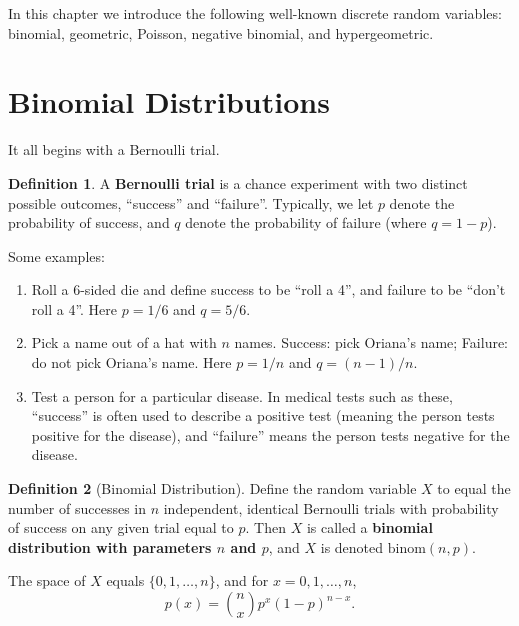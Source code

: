 \documentclass[
]{book}
\providecommand{\tightlist}{%
  \setlength{\itemsep}{0pt}\setlength{\parskip}{0pt}}
\theoremstyle{definition}
\newtheorem{definition}{Definition}[chapter]
\theoremstyle{definition}
\theoremstyle{definition}
\theoremstyle{definition}
\theoremstyle{remark}
\begin{document}
In this chapter we introduce the following well-known discrete random variables:
binomial, geometric, Poisson, negative binomial, and hypergeometric.

\section{Binomial Distributions}\label{binomial}

It all begins with a Bernoulli trial.

\begin{definition}
\protect\hypertarget{def:bernoulli-trial}{}\label{def:bernoulli-trial}A \textbf{Bernoulli trial} is a chance experiment with two distinct possible outcomes, ``success'' and ``failure''. Typically, we let \(p\) denote the probability of success, and \(q\) denote the probability of failure (where \(q = 1 - p\)).
\end{definition}

Some examples:

\begin{enumerate}
\def\labelenumi{\arabic{enumi}.}
\tightlist
\item
  Roll a 6-sided die and define success to be ``roll a 4'', and failure to be ``don't roll a 4''. Here \(p = 1/6\) and \(q = 5/6\).
\item
  Pick a name out of a hat with \(n\) names. Success: pick Oriana's name; Failure: do not pick Oriana's name. Here \(p = 1/n\) and \(q = (n-1)/n\).
\item
  Test a person for a particular disease. In medical tests such as these, ``success'' is often used to describe a positive test (meaning the person tests positive for the disease), and ``failure'' means the person tests negative for the disease.
\end{enumerate}

\begin{definition}[Binomial Distribution]
\protect\hypertarget{def:binomial-distribution}{}\label{def:binomial-distribution}Define the random variable \(X\) to equal the number of successes in \(n\) independent, identical Bernoulli trials with probability of success on any given trial equal to \(p\). Then \(X\) is called a \textbf{binomial distribution with parameters \(n\) and \(p\)}, and \(X\) is denoted \(\text{binom}(n,p)\).

The space of \(X\) equals \(\{0,1,\ldots,n\}\), and for \(x = 0,1, \ldots, n\),
\[p(x) = \binom{n}{x}p^x(1-p)^{n-x}.\]
\end{definition}
\end{document}

